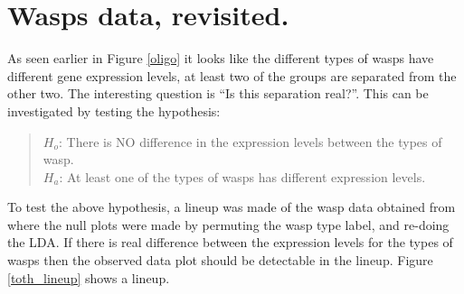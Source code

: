 \documentclass[12]{article}
\begin{document}

\section{Wasps data, revisited. }


As seen earlier in Figure \ref{oligo} it looks like the different types of wasps have different gene expression levels, at least two of the groups are separated from the other two.  The interesting question is ``Is this separation real?''. This can be investigated by testing the hypothesis: 

\begin{quote}
$H_o$: There is NO difference in the expression levels between the types of wasp.\\
$H_a$: At least one of the types of wasps has different expression levels.
\end{quote}


To test the above hypothesis, a lineup was made of the wasp data obtained from \cite{toth:2010} where the null plots were made by permuting the wasp type label, and re-doing the LDA. If there is real difference between the expression levels for the types of wasps then the observed data plot should be detectable in the lineup. Figure \ref{toth_lineup} shows a lineup. 
\end{document}
